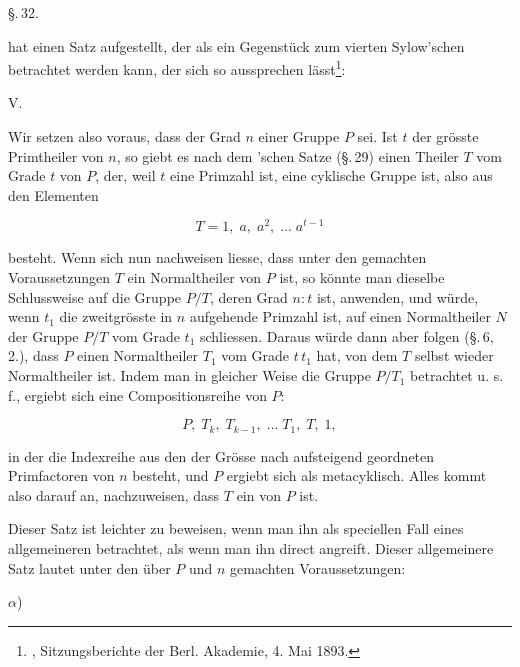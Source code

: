 \begin{center}
\S.\,32.

\end{center}

 hat einen Satz aufgestellt, der als ein Gegenstück zum vierten Sylow'schen betrachtet werden kann, der sich so aussprechen lässt\footnote{, Sitzungsberichte der Berl. Akademie, 4. Mai 1893.}:

V. 

Wir setzen also voraus, dass der Grad $n$ einer Gruppe $P$  sei. Ist $t$ der grösste Primtheiler von $n$, so giebt es nach dem 'schen Satze (\S.\,29) einen Theiler $T$ vom Grade $t$ von $P$, der, weil $t$ eine Primzahl ist, eine cyklische Gruppe ist, also aus den Elementen

\[
T = 1, \; a, \; a^2, \; \ldots \; a^{t-1}
\]

besteht. Wenn sich nun nachweisen liesse, dass unter den gemachten Voraussetzungen $T$ ein Normaltheiler von $P$ ist, so könnte man dieselbe Schlussweise auf die Gruppe $P/T$, deren Grad $n:t$ ist, anwenden, und würde, wenn $t_1$ die zweitgrösste in $n$ aufgehende Primzahl ist, auf einen Normaltheiler $N$ der Gruppe $P/T$ vom Grade $t_1$ schliessen. Daraus würde dann aber folgen (\S.\,6, 2.), dass $P$ einen Normaltheiler $T_1$ vom Grade $t\,t_1$ hat, von dem $T$ selbst wieder Normaltheiler ist. Indem man in gleicher Weise die Gruppe $P/T_1$ betrachtet u. s. f., ergiebt sich eine Compositionsreihe von $P$:

\[
P, \; T_k, \; T_{k-1}, \; \ldots \; T_1, \; T, \; 1,
\]

in der die Indexreihe aus den der Grösse nach aufsteigend geordneten Primfactoren von $n$ besteht, und $P$ ergiebt sich als metacyklisch. Alles kommt also darauf an, nachzuweisen, dass $T$ ein  von $P$ ist.

Dieser Satz ist leichter zu beweisen, wenn man ihn als speciellen Fall eines allgemeineren betrachtet, als wenn man ihn direct angreift. Dieser allgemeinere Satz lautet unter den über $P$ und $n$ gemachten Voraussetzungen:

$\alpha$) 
